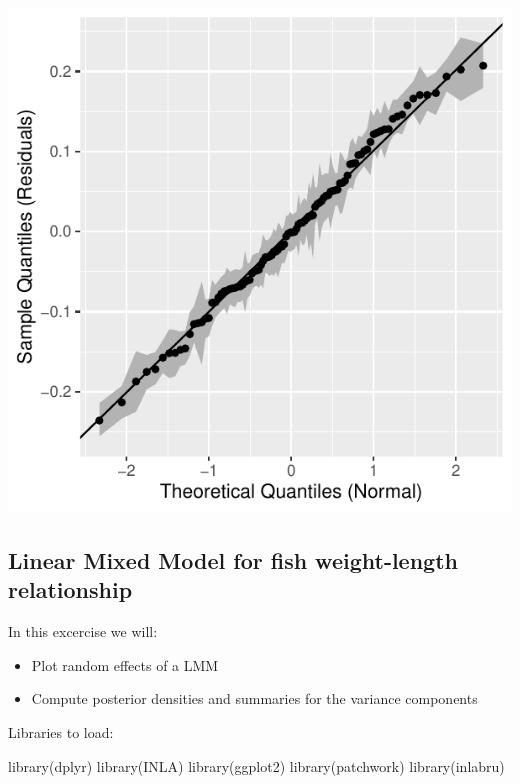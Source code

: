 \documentclass[
  letterpaper,
  DIV=11,
  numbers=noendperiod]{scrartcl}
\newenvironment{Shaded}{\begin{snugshade}}{\end{snugshade}}
\newcommand{\FunctionTok}[1]{\textcolor[rgb]{0.28,0.35,0.67}{#1}}
\newcommand{\NormalTok}[1]{\textcolor[rgb]{0.00,0.23,0.31}{#1}}
\providecommand{\tightlist}{%
  \setlength{\itemsep}{0pt}\setlength{\parskip}{0pt}}\usepackage{longtable,booktabs,array}
\begin{document}
\begin{center}
\includegraphics{day1_practical_2_files/figure-pdf/unnamed-chunk-14-1.pdf}
\end{center}

\subsection{Linear Mixed Model for fish weight-length
relationship}\label{sec-llm_fish}

In this excercise we will:

\begin{itemize}
\tightlist
\item
  Plot random effects of a LMM
\item
  Compute posterior densities and summaries for the variance components
\end{itemize}

Libraries to load:

\begin{Shaded}
\begin{Highlighting}[]
\FunctionTok{library}\NormalTok{(dplyr)}
\FunctionTok{library}\NormalTok{(INLA)}
\FunctionTok{library}\NormalTok{(ggplot2)}
\FunctionTok{library}\NormalTok{(patchwork)}
\FunctionTok{library}\NormalTok{(inlabru)     }
\end{Highlighting}
\end{Shaded}
\end{document}
